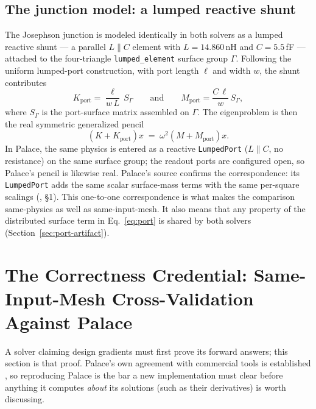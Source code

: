 \documentclass{anvil-paper}
\begin{document}
\subsection{The junction model: a lumped reactive shunt}
\label{sec:junction}

The Josephson junction is modeled identically in both solvers as a lumped
reactive shunt --- a parallel $L \parallel C$ element with
$L = 14.860$\,nH and $C = 5.5$\,fF --- attached to the four-triangle
\texttt{lumped\_element} surface group $\Gamma$. Following the uniform
lumped-port construction, with port length $\ell$ and width $w$, the shunt
contributes
\begin{equation}
  K_{\mathrm{port}} = \frac{\ell}{w\,L}\, S_\Gamma
  \qquad\text{and}\qquad
  M_{\mathrm{port}} = \frac{C\,\ell}{w}\, S_\Gamma ,
  \label{eq:port}
\end{equation}
where $S_\Gamma$ is the port-surface matrix assembled on $\Gamma$. The
eigenproblem is then the real symmetric generalized pencil
\begin{equation}
  \left(K + K_{\mathrm{port}}\right) x
  \;=\; \omega^2 \left(M + M_{\mathrm{port}}\right) x .
  \label{eq:pencil}
\end{equation}
In Palace, the same physics is entered as a reactive \texttt{LumpedPort}
($L \parallel C$, no resistance) on the same surface group; the readout
ports are configured open, so Palace's pencil is likewise real. Palace's
source confirms the correspondence: its \texttt{LumpedPort} adds the
same scalar surface-mass terms with the same per-square scalings
(, \S1). This
one-to-one correspondence is what makes the comparison same-physics as
well as same-input-mesh. It also means that any property of the
distributed surface term in Eq.~\ref{eq:port} is shared by both solvers
(Section~\ref{sec:port-artifact}).

\section{The Correctness Credential: Same-Input-Mesh Cross-Validation
Against Palace}
\label{sec:agreement}

A solver claiming design gradients must first prove its forward answers;
this section is that proof. Palace's own agreement with commercial tools
is established \citep{sommers2025open}, so reproducing Palace is the bar
a new implementation must clear before anything it computes \emph{about}
its solutions (such as their derivatives) is worth discussing.
\end{document}
